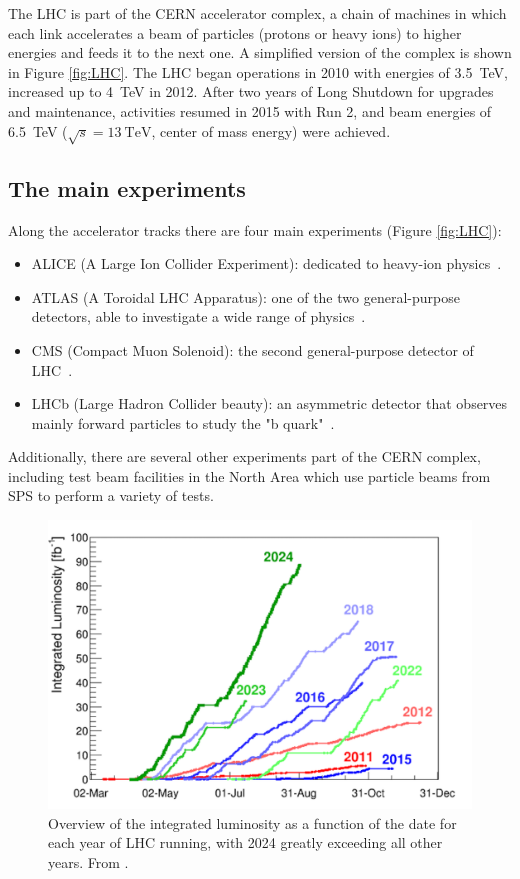 The LHC is part of the CERN accelerator complex, a chain of machines in which each link accelerates a beam of particles (protons or heavy ions) to higher energies and feeds it to the next one. A simplified version of the complex is shown in Figure \ref{fig:LHC}. The LHC began operations in 2010 with energies of \qty{3.5}{\tera\electronvolt}, increased up to \qty{4}{\tera\electronvolt} in 2012. After two years of Long Shutdown for upgrades and maintenance, activities resumed in 2015 with Run 2, and beam energies of \qty{6.5}{\tera\electronvolt} ($\sqrt{s}=\qty{13}{\tera\electronvolt}$, center of mass energy) were achieved.


\subsection{The main experiments}\label{subsec:LHC_main_experiments}

Along the accelerator tracks there are four main experiments (Figure \ref{fig:LHC}):
\begin{itemize}
    \item ALICE (A Large Ion Collider Experiment): dedicated to heavy-ion physics~\cite{aliceFrontpageAlicepublicwebcernch}.
    \item ATLAS (A Toroidal LHC Apparatus): one of the two general-purpose detectors, able to investigate a wide range of physics~\cite{atlasATLASExperiment}.
    \item CMS (Compact Muon Solenoid): the second general-purpose detector of LHC~\cite{cmsDetectorExperiment}.
    \item LHCb (Large Hadron Collider beauty): an asymmetric detector that observes mainly forward particles to study the "b quark"~\cite{cernLHCbCollaboration}.
\end{itemize}

Additionally, there are several other experiments part of the CERN complex, including test beam facilities in the North Area which use particle beams from SPS to perform a variety of tests.

\begin{figure}[!ht]
    \centering
    \includegraphics[width=.6\linewidth]{Images/intro/integrated_luminosity.png}
    \captionsetup{width=.8\linewidth}
    \caption{Overview of the integrated luminosity as a function of the date for each year of LHC running, with 2024 greatly exceeding all other years. From \cite{homeAcceleratorReport}.}
    \label{fig:integrated_luminosity}
\end{figure}

